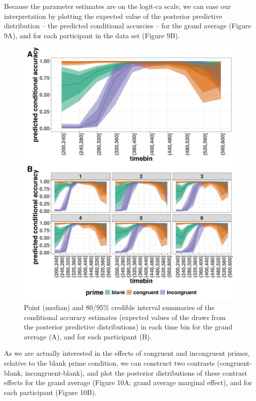 \documentclass[
  man, donotrepeattitle,floatsintext]{apa6}
\begin{document}
Because the parameter estimates are on the logit-ca scale, we can ease our interpretation by plotting the expected value of the posterior predictive distribution -- the predicted conditional accurcies -- for the grand average (Figure 9A), and for each participant in the data set (Figure 9B).



\begin{figure}[H]

{\centering \includegraphics[width=0.8\linewidth,height=0.67\textheight,]{../Tutorial_2_Bayesian/figures/M1i_ca_pred_combined} 

}

\caption{Point (median) and 80/95\% credible interval summaries of the conditional accuracy estimates (expected values of the draws from the posterior predictive distributions) in each time bin for the grand average (A), and for each participant (B).}\label{fig:plot-pred-grand-effects-ca}
\end{figure}

As we are actually interested in the effects of congruent and incongruent primes, relative to the blank prime condition, we can construct two contrasts (congruent-blank, incongruent-blank), and plot the posterior distributions of these contrast effects for the grand average (Figure 10A; grand average marginal effect), and for each participant (Figure 10B).
\end{document}

